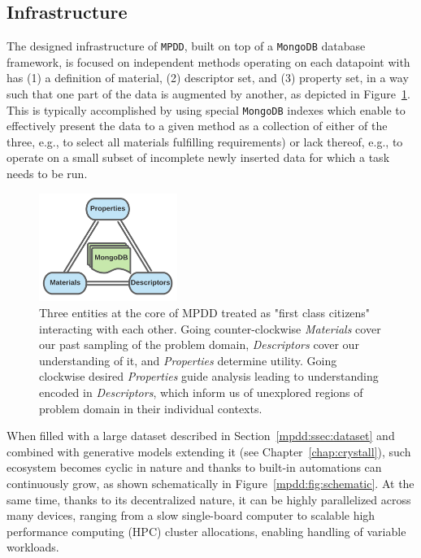 \subsection{Infrastructure} \label{mpdd:ssec:infrastructure}

The designed infrastructure of \texttt{MPDD}, built on top of a \texttt{MongoDB} database framework, is focused on independent methods operating on each datapoint with has (1) a definition of material, (2) descriptor set, and (3) property set, in a way such that one part of the data is augmented by another, as depicted in Figure~\ref{mpdd:fig:core}. This is typically accomplished by using special \texttt{MongoDB} indexes which enable to effectively present the data to a given method as a collection of either of the three, e.g., to select all materials fulfilling requirements) or lack thereof, e.g., to operate on a small subset of incomplete newly inserted data for which a task needs to be run.

\begin{figure}[H]
    \centering
    \includegraphics[width=0.4\textwidth]{mpdd/MPDD_CoreTriplet.png}
    \caption{Three entities at the core of MPDD treated as "first class citizens" interacting with each other. Going counter-clockwise \emph{Materials} cover our past sampling of the problem domain, \emph{Descriptors} cover our understanding of it, and \emph{Properties} determine utility. Going clockwise desired \emph{Properties} guide analysis leading to understanding encoded in \emph{Descriptors}, which inform us of unexplored regions of problem domain in their individual contexts.}
    \label{mpdd:fig:core}
\end{figure}

When filled with a large dataset described in Section~\ref{mpdd:ssec:dataset} and combined with generative models extending it (see Chapter~\ref{chap:crystall}), such ecosystem becomes cyclic in nature and thanks to built-in automations can continuously grow, as shown schematically in Figure~\ref{mpdd:fig:schematic}. At the same time, thanks to its decentralized nature, it can be highly parallelized across many devices, ranging from a slow single-board computer to scalable high performance computing (HPC) cluster allocations, enabling handling of variable workloads.


